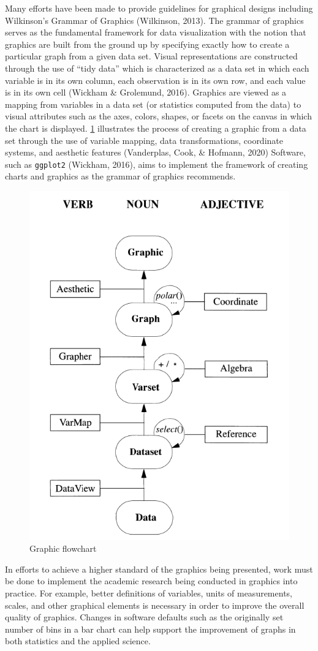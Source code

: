 \documentclass[print]{nuthesis}
\begin{document}
Many efforts have been made to provide guidelines for graphical designs including Wilkinson's Grammar of Graphics (Wilkinson, 2013).
The grammar of graphics serves as the fundamental framework for data visualization with the notion that graphics are built from the ground up by specifying exactly how to create a particular graph from a given data set.
Visual representations are constructed through the use of ``tidy data'' which is characterized as a data set in which each variable is in its own column, each observation is in its own row, and each value is in its own cell (Wickham \& Grolemund, 2016).
Graphics are viewed as a mapping from variables in a data set (or statistics computed from the data) to visual attributes such as the axes, colors, shapes, or facets on the canvas in which the chart is displayed.
\cref{fig:graphic-flowchart} illustrates the process of creating a graphic from a data set through the use of variable mapping, data transformations, coordinate systems, and aesthetic features (Vanderplas, Cook, \& Hofmann, 2020)
Software, such as \texttt{ggplot2} (Wickham, 2016), aims to implement the framework of creating charts and graphics as the grammar of graphics recommends.

\begin{figure}[tbp]

{\centering \includegraphics[width=0.5\linewidth,]{images/graphic-flowchart} 

}

\caption{Graphic flowchart}\label{fig:graphic-flowchart}
\end{figure}

In efforts to achieve a higher standard of the graphics being presented, work must be done to implement the academic research being conducted in graphics into practice.
For example, better definitions of variables, units of measurements, scales, and other graphical elements is necessary in order to improve the overall quality of graphics.
Changes in software defaults such as the originally set number of bins in a bar chart can help support the improvement of graphs in both statistics and the applied science.
\end{document}
